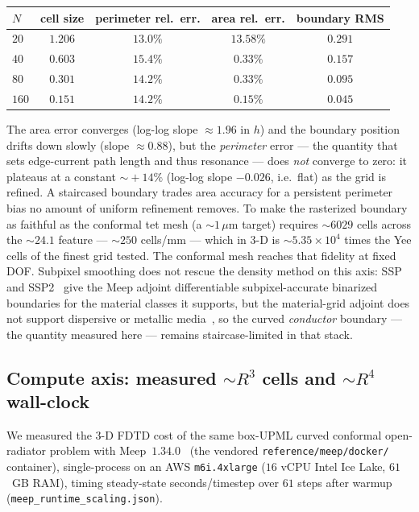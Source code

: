 \documentclass{anvil-paper}
\begin{document}
\begin{center}
\begin{tabular}{lcccc}
\toprule
$N$ & cell size & perimeter rel.\ err. & area rel.\ err. & boundary RMS \\
\midrule
$20$  & $1.206$ & $13.0\%$ & $13.58\%$ & $0.291$ \\
$40$  & $0.603$ & $15.4\%$ & $0.33\%$  & $0.157$ \\
$80$  & $0.301$ & $14.2\%$ & $0.33\%$  & $0.095$ \\
$160$ & $0.151$ & $14.2\%$ & $0.15\%$  & $0.045$ \\
\bottomrule
\end{tabular}
\end{center}

The area error converges (log-log slope $\approx\!1.96$ in $h$) and the boundary
position drifts down slowly (slope $\approx\!0.88$), but the \emph{perimeter}
error --- the quantity that sets edge-current path length and thus resonance ---
does \emph{not} converge to zero: it plateaus at a constant $\sim\!+14\%$
(log-log slope $-0.026$, i.e.\ flat) as the grid is refined. A staircased
boundary trades area accuracy for a persistent perimeter bias no amount of
uniform refinement removes. To make the rasterized boundary as faithful as the
conformal tet mesh (a $\sim\!1\,\mu$m target) requires $\sim\!6029$ cells across
the $\sim\!24.1$ feature --- $\sim\!250$ cells/mm --- which in 3-D is
$\sim\!5.35\times10^{4}$ times the Yee cells of the finest grid tested. The
conformal mesh reaches that fidelity at fixed DOF. Subpixel smoothing does not
rescue the density method on this axis: SSP~\cite{hammond2025ssp} and
SSP2~\cite{romano2026ssp2} give the Meep adjoint differentiable subpixel-accurate
binarized boundaries for the material classes it supports, but the material-grid
adjoint does not support dispersive or metallic media~\cite{meepadjointdocs},
so the curved \emph{conductor} boundary --- the quantity measured here ---
remains staircase-limited in that stack.

\subsection{Compute axis: measured $\sim\!R^3$ cells and $\sim\!R^4$ wall-clock}
\label{sec:runtime}

We measured the 3-D FDTD cost of the same box-UPML curved conformal open-radiator
problem with Meep~$1.34.0$~\cite{oskooi2010meep} (the vendored \texttt{reference/meep/docker/}
container), single-process on an AWS \texttt{m6i.4xlarge} ($16$ vCPU Intel Ice
Lake, $61$~GB RAM), timing steady-state seconds/timestep over $61$ steps after
warmup (\texttt{meep\_runtime\_scaling.json}).
\end{document}
